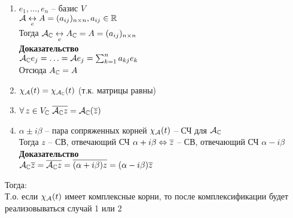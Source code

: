 \documentclass[12pt]{article}
\begin{document}
\begin{enumerate}
    \item $e_1, \ldots, e_n$ -- базис $V$\\
    $\mathcal{A} \underset{e}{\leftrightarrow} A = (a_{ij})_{n\times n}, a_{ij} \in \mathbb{R}$\\
    Тогда $\mathcal{A}_\mathbb{C} \underset e{\leftrightarrow} A_\mathbb{C} = A = (a_{ij})_{n\times n}$\\
    \textbf{Доказательство}\\
    $\mathcal{A}_\mathbb{C} e_j = \ldots = \mathcal{A} e_j = \sum_{k=1}^n a_{kj}e_k$\\
    Отсюда $A_\mathbb{C} = A$
    \item $\chi_\mathcal{A}(t) = \chi_{\mathcal{A}_\mathbb{C}}(t)$ (т.к. матрицы равны)
    \item $\forall\, z \in V_\mathbb{C}\ \overline{\mathcal{A}_\mathbb{C} z} = \mathcal{A}_\mathbb{C}(\overline z)$
    \item $\alpha\pm  i\beta$ -- пара сопряженных корней $\chi_\mathcal{A}(t)$ -- СЧ для $\mathcal{A}_\mathbb{C}$\\
    Тогда $z$ -- СВ, отвечающий СЧ $\alpha + i \beta \Leftrightarrow \overline z$ -- СВ, отвечающий СЧ $\alpha - i \beta$\\
    \textbf{Доказательство}\\
    $\mathcal{A}_\mathbb{C} \overline z = \overline{\mathcal{A}_\mathbb{C} z} = \overline {(\alpha+i\beta)z} = (\alpha - i\beta)\overline{z}$
\end{enumerate}
Тогда:\\
Т.о. если $\chi_\mathcal{A}(t)$ имеет комплексные корни, то после комплексификации будет реализовываться случай 1 или 2
\end{document}
